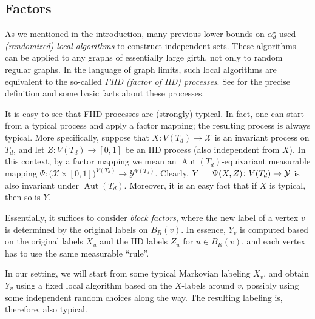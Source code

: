 \documentclass[12pt]{amsart}
\theoremstyle{definition}
\newcommand\Xc{\mathcal{X}}
\newcommand\Yc{\mathcal{Y}}
\newcommand\alstar{\alpha^{\star}}
\newcommand\muedge{\mu_\mathrm{edge}}
\newcommand\muvtx{\mu_\mathrm{vtx}}
\DeclareMathOperator{\Aut}{Aut}
\newcommand{\defeq}{\mathrel{\vcenter{\baselineskip0.5ex \lineskiplimit0pt
                     \hbox{\scriptsize.}\hbox{\scriptsize.}}}%
                     =}
\begin{document}
%
%
%


\subsection{Factors} \label{sec:factors}
%
As we mentioned in the introduction, many previous lower bounds on $\alstar_d$ used \emph{(randomized) local algorithms} to construct independent sets. These algorithms can be applied to any graphs of essentially large girth, not only to random regular graphs. In the language of graph limits, such local algorithms are equivalent to the so-called \emph{FIID (factor of IID) processes}. See \cite{backhausz2018largegirth} for the precise definition and some basic facts about these processes.

It is easy to see that FIID processes are (strongly) typical. In fact, one can start from a typical process and apply a factor mapping; the resulting process is always typical. More specifically, suppose that $X \colon V(T_d) \to \Xc$ is an invariant process on $T_d$, and let $Z \colon V(T_d) \to [0,1]$ be an IID process (also independent from $X$). In this context, by a factor mapping we mean an $\Aut(T_d)$-equivariant measurable mapping $\Psi \colon \big( \Xc \times [0,1] \big)^{V(T_d)} \to \Yc^{V(T_d)}$. Clearly, $Y \defeq \Psi(X,Z)\colon V(T_d) \to \Yc$ is also invariant under $\Aut(T_d)$. Moreover, it is an easy fact that if $X$ is typical, then so is $Y$.

Essentially, it suffices to consider \emph{block factors}, where the new label of a vertex $v$ is determined by the original labels on $B_R(v)$. In essence, $Y_v$ is computed based on the original labels $X_u$ and the IID labels $Z_u$ for $u \in B_R(v)$, and each vertex has to use the same measurable ``rule''.

In our setting, we will start from some typical Markovian labeling $X_v$, and obtain $Y_v$ using a fixed local algorithm based on the $X$-labels around $v$, possibly using some independent random choices along the way. The resulting labeling is, therefore, also typical.
\end{document}
